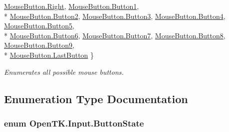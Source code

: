 \begin{DoxyCompactItemize}
\hyperlink{namespace_open_t_k_1_1_input_a2f6f4de1a952f42570d2e06fd15b5774a92b09c7c48c520c3c55e497875da437c}{Mouse\-Button.\-Right}, 
\hyperlink{namespace_open_t_k_1_1_input_a2f6f4de1a952f42570d2e06fd15b5774a6475a3746209a62a6ce6289a3741d07e}{Mouse\-Button.\-Button1}, 
\\*
\hyperlink{namespace_open_t_k_1_1_input_a2f6f4de1a952f42570d2e06fd15b5774ae165925a7c2d5ea94209b91389aa189f}{Mouse\-Button.\-Button2}, 
\hyperlink{namespace_open_t_k_1_1_input_a2f6f4de1a952f42570d2e06fd15b5774a6d0c69e60d65a93dd244ae95f90e679c}{Mouse\-Button.\-Button3}, 
\hyperlink{namespace_open_t_k_1_1_input_a2f6f4de1a952f42570d2e06fd15b5774a91ff24acfc01cc2c3a4238a272a37d07}{Mouse\-Button.\-Button4}, 
\hyperlink{namespace_open_t_k_1_1_input_a2f6f4de1a952f42570d2e06fd15b5774af8849babaeaee3344306b87310664d65}{Mouse\-Button.\-Button5}, 
\\*
\hyperlink{namespace_open_t_k_1_1_input_a2f6f4de1a952f42570d2e06fd15b5774a375ccc6b3a6125cc5c67f2c700a55b72}{Mouse\-Button.\-Button6}, 
\hyperlink{namespace_open_t_k_1_1_input_a2f6f4de1a952f42570d2e06fd15b5774aa00c628d1b186fa4fe9c7f633426979e}{Mouse\-Button.\-Button7}, 
\hyperlink{namespace_open_t_k_1_1_input_a2f6f4de1a952f42570d2e06fd15b5774a4f651f24c0b38f6e7ea0d52b0c514e36}{Mouse\-Button.\-Button8}, 
\hyperlink{namespace_open_t_k_1_1_input_a2f6f4de1a952f42570d2e06fd15b5774aefe28baa94fc5f90fde7d0ff617460a3}{Mouse\-Button.\-Button9}, 
\\*
\hyperlink{namespace_open_t_k_1_1_input_a2f6f4de1a952f42570d2e06fd15b5774ac253b239e7597f897569b441c2509221}{Mouse\-Button.\-Last\-Button}
 \}
\begin{DoxyCompactList}\small\item\em Enumerates all possible mouse buttons. \end{DoxyCompactList}\end{DoxyCompactItemize}


\subsection{Enumeration Type Documentation}
\hypertarget{namespace_open_t_k_1_1_input_a115b5677e3f8372e1c952fedc964d161}{
\subsubsection[{Button\-State}]{\setlength{\rightskip}{0pt plus 5cm}enum {\bf Open\-T\-K.\-Input.\-Button\-State}}}\label{namespace_open_t_k_1_1_input_a115b5677e3f8372e1c952fedc964d161}


